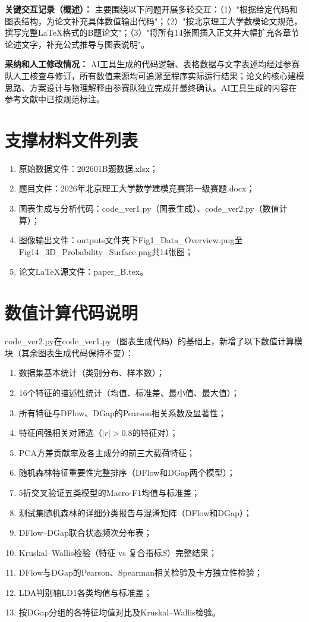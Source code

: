 \documentclass[UTF8,a4paper,12pt]{ctexart}
\begin{document}
\noindent\textbf{关键交互记录（概述）：}
主要围绕以下问题开展多轮交互：（1）"根据给定代码和图表结构，为论文补充具体数值输出代码"；（2）"按北京理工大学数模论文规范，撰写完整LaTeX格式的B题论文"；（3）"将所有14张图插入正文并大幅扩充各章节论述文字，补充公式推导与图表说明"。

\noindent\textbf{采纳和人工修改情况：}
AI工具生成的代码逻辑、表格数据与文字表述均经过参赛队人工核查与修订，所有数值来源均可追溯至程序实际运行结果；论文的核心建模思路、方案设计与物理解释由参赛队独立完成并最终确认。AI工具生成的内容在参考文献中已按规范标注。

\appendix
\section{支撑材料文件列表}
\begin{enumerate}[label=(\arabic*),leftmargin=2em]
\item 原始数据文件：202601B题数据.xlsx；
\item 题目文件：2026年北京理工大学数学建模竞赛第一级赛题.docx；
\item 图表生成与分析代码：code\_ver1.py（图表生成）、code\_ver2.py（数值计算）；
\item 图像输出文件：outputs文件夹下Fig1\_Data\_Overview.png至Fig14\_3D\_Probability\_Surface.png共14张图；
\item 论文LaTeX源文件：paper\_B.tex。
\end{enumerate}

\section{数值计算代码说明}

code\_ver2.py在code\_ver1.py（图表生成代码）的基础上，新增了以下数值计算模块（其余图表生成代码保持不变）：

\begin{enumerate}[label=(\arabic*),leftmargin=2em]
\item 数据集基本统计（类别分布、样本数）；
\item 16个特征的描述性统计（均值、标准差、最小值、最大值）；
\item 所有特征与DFlow、DGap的Pearson相关系数及显著性；
\item 特征间强相关对筛选（$|r|>0.8$的特征对）；
\item PCA方差贡献率及各主成分的前三大载荷特征；
\item 随机森林特征重要性完整排序（DFlow和DGap两个模型）；
\item 5折交叉验证五类模型的Macro-F1均值与标准差；
\item 测试集随机森林的详细分类报告与混淆矩阵（DFlow和DGap）；
\item DFlow--DGap联合状态频次分布表；
\item Kruskal--Wallis检验（特征 vs 复合指标$S$）完整结果；
\item DFlow与DGap的Pearson、Spearman相关检验及卡方独立性检验；
\item LDA判别轴LD1各类均值与标准差；
\item 按DGap分组的各特征均值对比及Kruskal--Wallis检验。
\end{enumerate}
\end{document}

